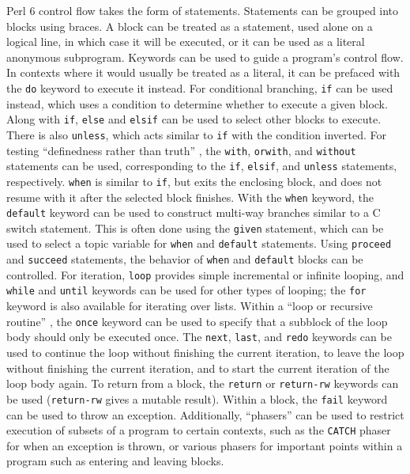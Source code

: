 \documentclass[14pt,english]{extarticle}
\begin{document}
Perl 6 control flow takes the form of statements. Statements can be
grouped into blocks using braces. A block can be treated as a statement,
used alone on a logical line, in which case it will be executed, or
it can be used as a literal anonymous subprogram. Keywords can be
used to guide a program's control flow. In contexts where it would
usually be treated as a literal, it can be prefaced with the \texttt{do}
keyword to execute it instead. For conditional branching, \texttt{if}
can be used instead, which uses a condition to determine whether to
execute a given block. Along with \texttt{if}, \texttt{else} and \texttt{elsif}
can be used to select other blocks to execute. There is also \texttt{unless},
which acts similar to \texttt{if} with the condition inverted. For
testing ``definedness rather than truth'' \cite{Documentation},
the \texttt{with}, \texttt{orwith}, and \texttt{without} statements
can be used, corresponding to the \texttt{if}, \texttt{elsif}, and
\texttt{unless} statements, respectively. \texttt{when} is similar
to \texttt{if}, but exits the enclosing block, and does not resume
with it after the selected block finishes. With the \texttt{when}
keyword, the \texttt{default} keyword can be used to construct multi-way
branches similar to a C switch statement. This is often done using
the \texttt{given} statement, which can be used to select a topic
variable for \texttt{when} and \texttt{default} statements. Using
\texttt{proceed} and \texttt{succeed} statements, the behavior of
\texttt{when} and \texttt{default} blocks can be controlled. For iteration,
\texttt{loop} provides simple incremental or infinite looping, and
\texttt{while} and \texttt{until} keywords can be used for other types
of looping; the \texttt{for} keyword is also available for iterating
over lists. Within a ``loop or recursive routine'' \cite{Documentation},
the \texttt{once} keyword can be used to specify that a subblock of
the loop body should only be executed once. The \texttt{next}, \texttt{last},
and \texttt{redo} keywords can be used to continue the loop without
finishing the current iteration, to leave the loop without finishing
the current iteration, and to start the current iteration of the loop
body again. To return from a block, the \texttt{return} or \texttt{return-rw}
keywords can be used (\texttt{return-rw} gives a mutable result).
Within a block, the \texttt{fail} keyword can be used to throw an
exception. Additionally, ``phasers'' can be used to restrict execution
of subsets of a program to certain contexts, such as the \texttt{CATCH}
phaser for when an exception is thrown, or various phasers for important
points within a program such as entering and leaving blocks. \cite{Documentation}
\end{document}

